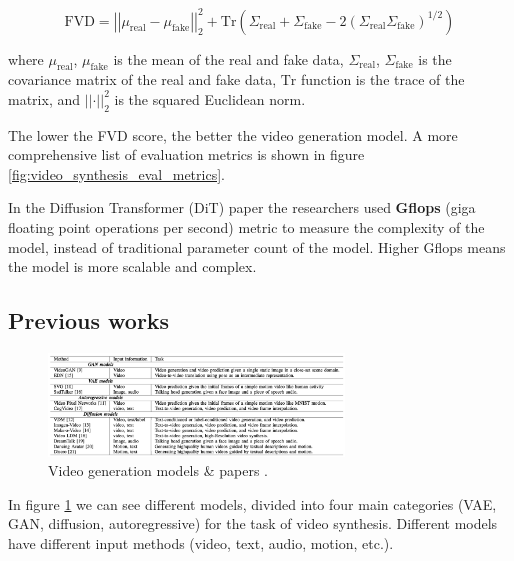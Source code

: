 \begin{equation*}
    \text{FVD} = \left| \left| \mu_{\text{real}} - \mu_{\text{fake}} \right| \right|^2_2 + \text{Tr} \left( \Sigma_{\text{real}} + \Sigma_{\text{fake}} - 2 \left( \Sigma_{\text{real}} \Sigma_{\text{fake}} \right)^{1/2} \right)
\end{equation*}

where $\mu_{\text{real}}$, $\mu_{\text{fake}}$ is the mean of the real and fake data, $\Sigma_{\text{real}}$, $\Sigma_{\text{fake}}$ is the covariance matrix of the real and fake data, $\text{Tr}$ function is the trace of the matrix, and $\left| \left| \cdot \right| \right|^2_2$ is the squared Euclidean norm.

The lower the FVD score, the better the video generation model. A more comprehensive list of evaluation metrics is shown in figure \ref{fig:video_synthesis_eval_metrics}.

In the Diffusion Transformer (DiT) paper \cite{diffusion_transformer} the researchers used \textbf{Gflops} (giga floating point operations per second) metric to measure the complexity of the model, instead of traditional parameter count of the model. Higher Gflops means the model is more scalable and complex.








\subsection{Previous works}

\begin{figure}
    \centering
    \includegraphics[width=0.7\textwidth]{images/video_synthesis/previous_works.png}
    \caption{Video generation models \& papers \cite{zhou2024survey}.}
    \label{fig:video_synthesis_previous_works}
\end{figure}

In figure \ref{fig:video_synthesis_previous_works} we can see different models, divided into four main categories (VAE, GAN, diffusion, autoregressive) for the task of video synthesis. Different models have different input methods (video, text, audio, motion, etc.).

